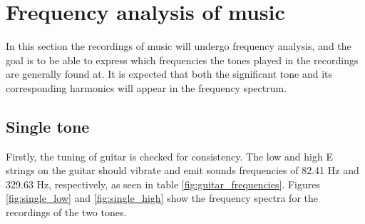 \section{Frequency analysis of music}
In this section the recordings of music will undergo frequency analysis, and the goal is to be able to express which frequencies the tones played in the recordings are generally found at. It is expected that both the significant tone and its corresponding harmonics will appear in the frequency spectrum.
   
\subsection{Single tone} \label{sec:single}
Firstly, the tuning of guitar is checked for consistency. The low and high E strings on the guitar should vibrate and emit sounds frequencies of 82.41 Hz and 329.63 Hz, respectively, as seen in table \ref{fig:guitar_frequencies}. Figures \ref{fig:single_low} and \ref{fig:single_high} show the frequency spectra for the recordings of the two tones.
